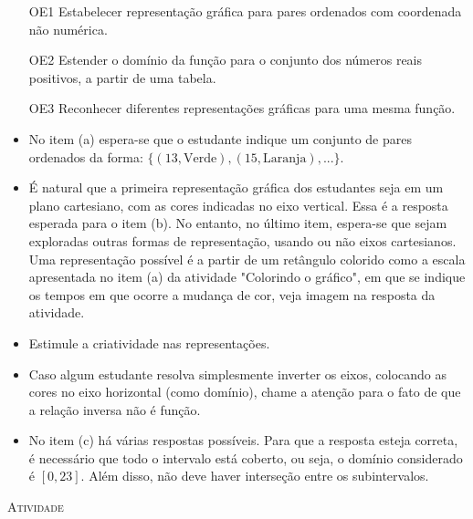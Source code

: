 \documentclass[10 pt,usenames,dvipsnames, oneside]{article}
\begin{document}
\begin{goals}
\begin{enumerate}

\item[OE1] Estabelecer representação gráfica para pares ordenados com coordenada não numérica.

\item[OE2] Estender o domínio da função para o conjunto dos números reais positivos, a partir de uma tabela.

\item[OE3] Reconhecer diferentes representações gráficas para uma mesma função.

\end{enumerate}

\tcblower

\begin{itemize}
\item No item (a) espera-se que o estudante indique um conjunto de pares ordenados da forma: $\{(13, \text{Verde}),(15, \text{Laranja}),...\}$.

\item É natural que a primeira representação gráfica dos estudantes seja em um plano cartesiano, com as cores indicadas no eixo vertical. Essa é a resposta esperada para o item (b). No entanto, no último item, espera-se que sejam exploradas outras formas de representação, usando ou não eixos cartesianos. Uma representação possível é a partir de um retângulo colorido como a escala apresentada no item (a) da atividade "Colorindo o gráfico", em que se indique os tempos em que ocorre a mudança de cor, veja imagem na resposta da atividade.

\item Estimule a criatividade nas representações.

\item Caso algum estudante resolva simplesmente inverter os eixos, colocando as cores no eixo horizontal (como domínio), chame a atenção para o fato de que a relação inversa não é função.

\item No item (c) há várias respostas possíveis. Para que a resposta esteja correta, é necessário que todo o intervalo está coberto, ou seja, o domínio considerado é $[0,23]$. Além disso, não deve haver interseção entre os subintervalos.
\end{itemize}

\end{goals}

\bigskip
\begin{center}
{\large \scshape Atividade}
\end{center}
\fi
\end{document}
